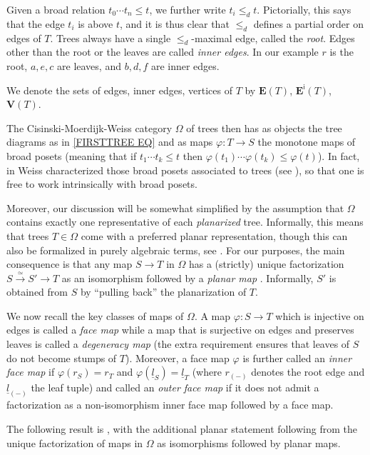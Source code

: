 \documentclass[a4paper,10pt
 ,draft
]{article}%
\begin{document}
Given a broad relation $t_0 \cdots t_n \leq t$,
we further write $t_i \leq_d t$.
Pictorially, this says that the edge $t_i$ is above $t$,
and it is thus clear that $\leq_d$ defines a partial order on edges of $T$.
Trees always have a single $\leq_d$-maximal edge, called the \textit{root}. Edges other than the root or the leaves are called \textit{inner edges}. In our example $r$ is the root, $a,e,c$ are leaves, and $b,d,f$ are inner edges. 

We denote the sets of edges, inner edges, vertices of $T$ by 
$\boldsymbol{E}(T)$, $\boldsymbol{E}^{\mathsf{i}}(T)$,
$\boldsymbol{V}(T)$.

The Cisinski-Moerdijk-Weiss category $\Omega$ of trees then has as objects the tree diagrams as in \eqref{FIRSTTREE EQ}
and as maps $\varphi \colon T \to S$ the monotone maps of broad posets
(meaning that if $t_1 \cdots t_k \leq t$ then
$\varphi(t_1) \cdots \varphi(t_k) \leq \varphi(t)$).
In fact, in \cite{Wei12} Weiss characterized 
those broad posets associated to trees (see \cite[Defs. 5.1 and 5.9]{Per18}),
so that one is free to work intrinsically with broad posets.

Moreover, our discussion will be somewhat simplified by the assumption that $\Omega$
contains exactly one representative of each \textit{planarized} tree.
Informally, this means that trees $T \in \Omega$
come with a preferred planar representation,
though this can also be formalized in purely algebraic terms, see \cite[\S 3.1]{BP17}.
For our purposes, the main consequence is that any map 
$S \to T$ in $\Omega$ has a (strictly) unique factorization
$S \xrightarrow{\simeq} S' \to T$ as an isomorphism followed by a \textit{planar map} \cite[Prop. 3.23]{BP17}. 
Informally, $S'$ is obtained from $S$
by ``pulling back'' the planarization of $T$.

We now recall the key classes of maps of $\Omega$.
A map $\varphi \colon S \to T$ which is injective on edges is called a \textit{face map}
while a map that is surjective on edges and preserves leaves is called a \textit{degeneracy map}
(the extra requirement ensures that leaves of $S$ do not become stumps of $T$).
Moreover, a face map $\varphi$ is further called an \textit{inner face map}
if $\varphi(r_S) = r_T$ and 
$\varphi(\underline{l}_S) = \underline{l}_T$ 
(where $r_{(-)}$ denotes the root edge and $\underline{l}_{(-)}$ the leaf tuple)
and called an \textit{outer face map} if it does not admit a factorization as a non-isomorphism inner face map followed by a face map.

The following result is \cite[Cor. 3.32]{BP17}, with the additional planar statement following from the unique factorization of maps in $\Omega$ as isomorphisms followed by planar maps. 
\end{document}
